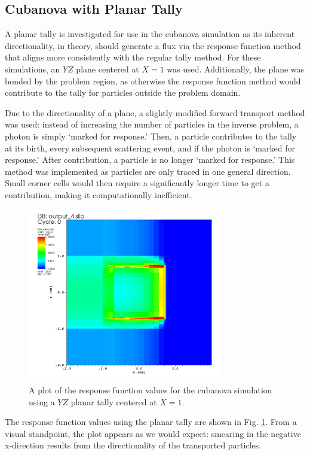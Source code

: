 \documentclass[]{article}
\begin{document}
	\subsection{Cubanova with Planar Tally} \label{Sec: plane_tally}		
		A planar tally is investigated for use in the cubanova simulation as its inherent directionality, in theory, should generate a flux via the response function method that aligns more consistently with the regular tally method. For these simulations, an $YZ$ plane centered at $X = 1$ was used. Additionally, the plane was bonded by the problem region, as otherwise the response function method would contribute to the tally for particles outside the problem domain. 
		
		Due to the directionality of a plane, a slightly modified forward transport method was used: instead of increasing the number of particles in the inverse problem, a photon is simply `marked for response.' Then, a particle contributes to the tally at its birth, every subsequent scattering event, and if the photon is `marked for response.' After contribution, a particle is no longer `marked for response.' This method was implemented as particles are only traced in one general direction. Small corner cells would then require a significantly longer time to get a contribution, making it computationally inefficient.
		
		\begin{figure} [h!]
			\centering
			\includegraphics[height=3in]{Figures/plane_r_sig_a.png}
			\caption{A plot of the response function values for the cubanova simulation using a $YZ$ planar tally centered at $X=1$. }
			\label{fig:plane_r_sig_a}
		\end{figure}
		
		The response function values using the planar tally are shown in Fig. \ref{fig:plane_r_sig_a}. From a visual standpoint, the plot appears as we would expect: smearing in the negative x-direction results from the directionality of the transported particles.
		
\end{document}
